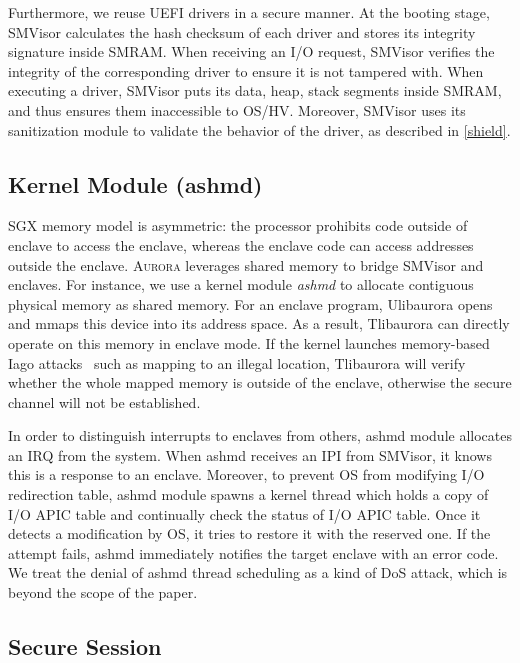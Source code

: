 \documentclass[journal,twocolumn,letterpaper,10pt]{IEEEtran}
\begin{document}
Furthermore, we reuse UEFI drivers in a secure manner. At the booting stage, SMVisor calculates the hash checksum of each driver and stores its integrity signature inside SMRAM. When receiving an I/O request, SMVisor verifies the integrity of the corresponding driver to ensure it is not tampered with. When executing a driver, SMVisor puts its data, heap, stack segments inside SMRAM, and thus ensures them inaccessible to OS/HV. Moreover, SMVisor uses its sanitization module to validate the behavior of the driver, as described in \autoref{shield}.

\subsection{Kernel Module (ashmd)}
SGX memory model is asymmetric: the processor prohibits code outside of enclave to access the enclave, whereas the enclave code can access addresses outside the enclave. \textsc{Aurora} leverages shared memory to bridge SMVisor and enclaves. For instance, we use a kernel module \emph{ashmd} to allocate contiguous physical memory as shared memory. For an enclave program, Ulibaurora opens and mmaps this device into its  address space. As a result, Tlibaurora can directly operate on this memory in enclave mode. If the kernel launches memory-based Iago attacks~\cite{DBLP:conf/asplos/CheckowayS13} such as mapping to an illegal location, Tlibaurora will verify whether the whole mapped memory is outside of the enclave, otherwise the secure channel will not be established. 

In order to distinguish interrupts to enclaves from others, ashmd module allocates an IRQ from the system. When ashmd receives an IPI from  SMVisor, it knows this is a response to an enclave.
Moreover, to prevent OS from modifying I/O redirection table, ashmd module spawns a kernel thread which holds a copy of  I/O APIC table and continually check the status of I/O APIC  table. Once it detects a modification by OS, it tries to restore it with the reserved one. If the attempt fails, ashmd  immediately notifies the target enclave with an error code.  We treat the denial of ashmd thread scheduling as a kind of DoS attack, which is beyond the scope of the paper.

\subsection{Secure Session}\label{secure_session}
\end{document}
